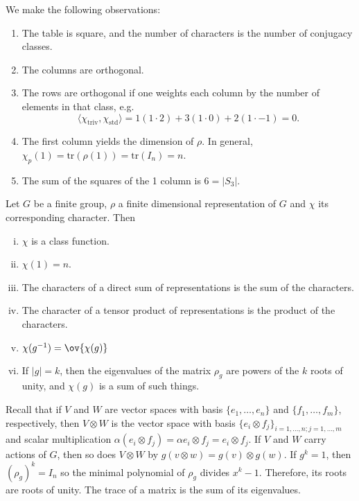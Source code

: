 \begin{ex}
\begin{table}[h]
\begin{tabular}{c|rrr}
	\end{tabular}
	\end{table}
We make the following observations:
	\begin{enumerate}[1.]
	\item The table is square, and the number of characters is the number of conjugacy classes.
	\item The columns are orthogonal.
	\item The rows are orthogonal if one weights each column by the number of elements in that class, e.g.
		\[
		\langle \chi_{\text{triv}}, \chi_{\text{std}} \rangle = 1(1 \cdot 2 ) + 3(1 \cdot 0) + 2(1\cdot -1)=0.
		\]
	\item The first column yields the dimension of $\rho$. In general, $\chi_p(1)=\text{tr}(\rho(1))= \text{tr}(I_n)=n$.
	\item The sum of the squares of the 1 column is $6=|S_3|$. 
	\end{enumerate}


\end{ex}






\begin{prop}
Let $G$ be a finite group, $\rho$ a finite dimensional representation of $G$ and $\chi$ its corresponding character. Then
	\begin{enumerate}[(i)]
	\item $\chi$ is a class function.
	\item $\chi(1)=n$.
	\item The characters of a direct sum of representations is the sum of the characters.
	\item The character of a tensor product of representations is the product of the characters.	
	\item $\chi(g^{-1})=\ov{\chi(g)}$
	\item If $|g|=k$, then the eigenvalues of the matrix $\rho_g$ are powers of the $k$ roots of unity, and $\chi(g)$ is a sum of such things.
	\end{enumerate}
\end{prop}


Recall that if $V$ and $W$ are vector spaces with basis $\{e_1,\ldots,e_n\}$ and $\{f_1,\ldots,f_m\}$, respectively, then $V \otimes W$ is the vector space with basis $\{e_i \otimes f_j \}_{i=1,\ldots,n; j=1,\ldots,m}$ and scalar multiplication $\alpha(e_i \otimes f_j) = \alpha e_i \otimes f_j= e_i \otimes f_j$. If $V$ and $W$ carry actions of $G$, then so does $V \otimes W$ by $g(v\otimes w)= g(v) \otimes g(w)$. 
If $g^k=1$, then $(\rho_g)^k=I_n$ so the minimal polynomial of $\rho_g$ divides $x^k-1$. Therefore, its roots are roots of unity. The trace of a matrix is the sum of its eigenvalues.




